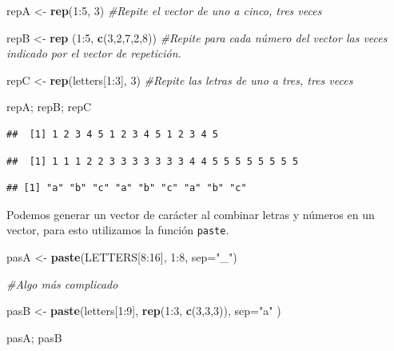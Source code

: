 \documentclass[]{article}
\newenvironment{Shaded}{\begin{snugshade}}{\end{snugshade}}
\newcommand{\KeywordTok}[1]{\textcolor[rgb]{0.13,0.29,0.53}{\textbf{{#1}}}}
\newcommand{\DataTypeTok}[1]{\textcolor[rgb]{0.13,0.29,0.53}{{#1}}}
\newcommand{\DecValTok}[1]{\textcolor[rgb]{0.00,0.00,0.81}{{#1}}}
\newcommand{\StringTok}[1]{\textcolor[rgb]{0.31,0.60,0.02}{{#1}}}
\newcommand{\CommentTok}[1]{\textcolor[rgb]{0.56,0.35,0.01}{\textit{{#1}}}}
\newcommand{\NormalTok}[1]{{#1}}
\begin{document}
\begin{Shaded}
\begin{Highlighting}[]
\NormalTok{repA <-}\StringTok{ }\KeywordTok{rep}\NormalTok{(}\DecValTok{1}\NormalTok{:}\DecValTok{5}\NormalTok{, }\DecValTok{3}\NormalTok{) }\CommentTok{#Repite el vector de uno a cinco, tres veces }

\NormalTok{repB <-}\StringTok{ }\KeywordTok{rep} \NormalTok{(}\DecValTok{1}\NormalTok{:}\DecValTok{5}\NormalTok{, }\KeywordTok{c}\NormalTok{(}\DecValTok{3}\NormalTok{,}\DecValTok{2}\NormalTok{,}\DecValTok{7}\NormalTok{,}\DecValTok{2}\NormalTok{,}\DecValTok{8}\NormalTok{)) }\CommentTok{#Repite para cada número del vector las veces  indicado por el vector de repetición.}

\NormalTok{repC <-}\StringTok{ }\KeywordTok{rep}\NormalTok{(letters[}\DecValTok{1}\NormalTok{:}\DecValTok{3}\NormalTok{], }\DecValTok{3}\NormalTok{) }\CommentTok{#Repite las letras de uno a tres, tres veces}

\NormalTok{repA; repB; repC}
\end{Highlighting}
\end{Shaded}

\begin{verbatim}
##  [1] 1 2 3 4 5 1 2 3 4 5 1 2 3 4 5
\end{verbatim}

\begin{verbatim}
##  [1] 1 1 1 2 2 3 3 3 3 3 3 3 4 4 5 5 5 5 5 5 5 5
\end{verbatim}

\begin{verbatim}
## [1] "a" "b" "c" "a" "b" "c" "a" "b" "c"
\end{verbatim}

Podemos generar un vector de carácter al combinar letras y números en un
vector, para esto utilizamos la función \texttt{paste}.

\begin{Shaded}
\begin{Highlighting}[]
\NormalTok{pasA <-}\StringTok{ }\KeywordTok{paste}\NormalTok{(LETTERS[}\DecValTok{8}\NormalTok{:}\DecValTok{16}\NormalTok{], }\DecValTok{1}\NormalTok{:}\DecValTok{8}\NormalTok{, }\DataTypeTok{sep=}\StringTok{"_"}\NormalTok{)}

\CommentTok{#Algo más complicado}

\NormalTok{pasB <-}\StringTok{ }\KeywordTok{paste}\NormalTok{(letters[}\DecValTok{1}\NormalTok{:}\DecValTok{9}\NormalTok{], }\KeywordTok{rep}\NormalTok{(}\DecValTok{1}\NormalTok{:}\DecValTok{3}\NormalTok{, }\KeywordTok{c}\NormalTok{(}\DecValTok{3}\NormalTok{,}\DecValTok{3}\NormalTok{,}\DecValTok{3}\NormalTok{)), }\DataTypeTok{sep=}\StringTok{"a"} \NormalTok{)}

\NormalTok{pasA; pasB}
\end{Highlighting}
\end{Shaded}
\end{document}
